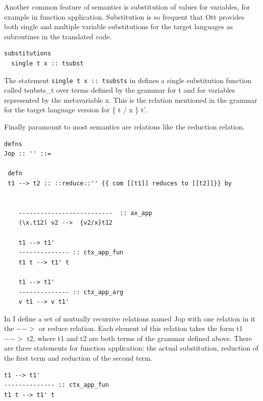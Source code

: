 \documentclass[12pt,twoside,notitlepage]{report}
\begin{document}
Another common feature of semantics is substitution of values for variables, for example in function application. Substitution is so frequent that Ott provides both single and multiple variable substitutions for the target languages as subroutines in the translated code.




\begin{minipage}{\linewidth}

\begin{lstlisting}[language={Ott}, caption={Ott substitution example}, label={lst:ottsubstex}]
substitutions
  single t x :: tsubst 
\end{lstlisting}

\end{minipage}


The statement \lstinline[language={Ott}]|single t x :: tsubsts| in  defines a single substitution function called tsubsts\_t over terms defined by the grammar for t and for variables represented by the metavariable x. This is the relation mentioned in the grammar for the target language version for \{ t / x \} t'.



Finally paramount to most semantics are relations like the reduction relation.

\begin{lstlisting}[language={Ott}, caption={Ott reduction relation example}, label={lst:ottredex}]
defns
Jop :: '' ::=

 defn
 t1 --> t2 :: ::reduce::'' {{ com [[t1]] reduces to [[t2]]}} by


    --------------------------  :: ax_app
    (\x.t12) v2 -->  {v2/x}t12

    t1 --> t1'
    -------------- :: ctx_app_fun
    t1 t --> t1' t

    t1 --> t1'
    -------------- :: ctx_app_arg
    v t1 --> v t1'
\end{lstlisting}

In  I define a set of mutually recursive relations named Jop with one relation in it the $-->$ or reduce relation. Each element of this relation takes the form t1 $-->$ t2, where t1 and t2 are both terms of the grammar defined above. There are three statements for function application: the actual substitution, reduction of the first term and reduction of the second term. 

\begin{lstlisting}[language={Ott}, caption={Ott single reduction}]
t1 --> t1'
-------------- :: ctx_app_fun
t1 t --> t1' t
\end{lstlisting}
\end{document}
